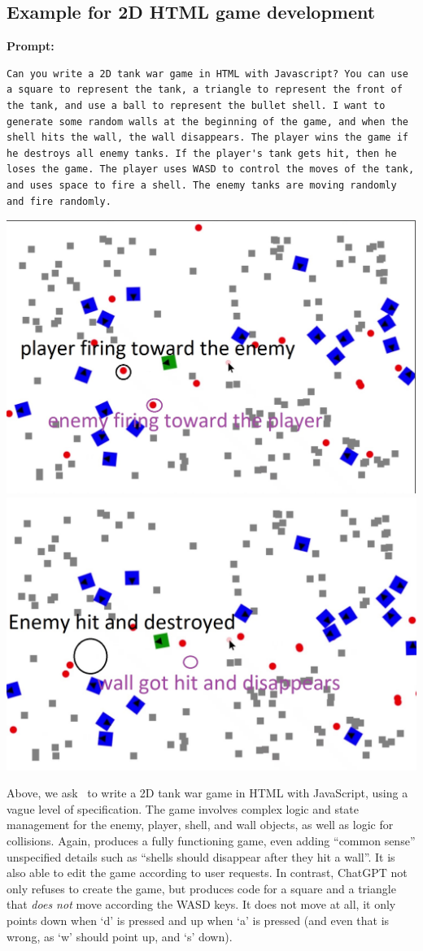 \subsection{Example for 2D HTML game development}

\begin{AIbox}{\DV}
{\bf\scriptsize Prompt:} \vspace{-5px}
\begin{verbatim}
Can you write a 2D tank war game in HTML with Javascript? You can use a square to represent the tank, a triangle to represent the front of the tank, and use a ball to represent the bullet shell. I want to generate some random walls at the beginning of the game, and when the shell hits the wall, the wall disappears. The player wins the game if he destroys all enemy tanks. If the player's tank gets hit, then he loses the game. The player uses WASD to control the moves of the tank, and uses space to fire a shell. The enemy tanks are moving randomly and fire randomly.
\end{verbatim}
\includegraphics[height=0.32\linewidth]{figures/t01.jpg} \hfill \includegraphics[height=0.32\linewidth]{figures/t02.jpg}
\end{AIbox}

Above, we ask \DV\ to write a 2D tank war game in HTML with JavaScript, using a vague level of specification.
The game involves complex logic and state management for the enemy, player, shell, and wall objects, as well as logic for collisions.
Again, \DV{} produces a fully functioning game, even adding ``common sense'' unspecified details such as ``shells should disappear after they hit a wall''. It is also able to edit the game according to user requests.  In contrast, ChatGPT not only refuses to create the game, but produces code for a square and a triangle that \emph{does not} move according the WASD keys. It does not move at all, it only points down when `d' is pressed and up when `a' is pressed (and even that is wrong, as `w' should point up, and `s' down).

